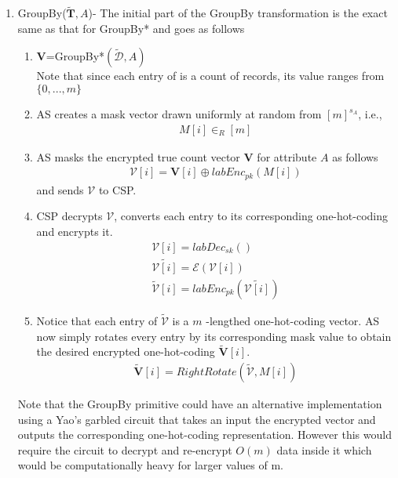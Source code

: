 \begin{enumerate}
\begin{enumerate} [label=(\alph*)]
\end{enumerate}
\item \textsf{GroupBy}($\mathbf{\tilde{T}},A$)- The initial part of the  \textsf{GroupBy} transformation is the exact same as that  for \textsf{GroupBy*} and goes as follows   \begin{enumerate}\item $\mathbf{V}$=\textsf{GroupBy*}$(\boldsymbol{\tilde{\mathcal{D}}},A)$ \\Note that since each entry of is a count of records, its value ranges from $\{0,...,m\}$\item \textsf{AS} creates a mask vector drawn uniformly at random from $[m]^{s_A}$, i.e.,  \begin{gather} M[i] \in_R [m]\end{gather} \item \textsf{AS} masks the encrypted true count vector $\mathbf{V}$ for attribute $A$ as follows \begin{gather}\boldsymbol{\mathcal{V}}[i]= \mathbf{V}[i] \oplus labEnc_{pk}(M[i])\end{gather} and sends $\boldsymbol{\mathcal{V}}$ to \textsf{CSP}.\item \textsf{CSP} decrypts $\boldsymbol{\mathcal{V}}$, converts each entry to its corresponding one-hot-coding and encrypts it. \begin{gather*}\mathcal{V}[i]=labDec_{sk}(\boldsymbol{})\\\tilde{\mathcal{V}[i]}=\mathcal{E}(\mathcal{V}[i])\\\boldsymbol{\tilde{\mathcal{V}}}[i]=labEnc_{pk}(\tilde{\mathcal{V}[i]})\end{gather*}\item Notice that each entry of $\boldsymbol{\tilde{\mathcal{V}}}$ is a $m$ -lengthed one-hot-coding vector. \textsf{AS} now simply rotates every entry by its corresponding mask value to obtain the desired  encrypted one-hot-coding $\boldsymbol{\tilde{V}}[i]$. \begin{gather}\boldsymbol{\tilde{V}}[i]=RightRotate(\boldsymbol{\tilde{\mathcal{V}}},M[i])\end{gather}  \end{enumerate} Note that the \textsf{GroupBy} primitive could have an alternative implementation using a Yao's garbled circuit that takes an input the encrypted vector and outputs the corresponding one-hot-coding representation. However this would require the circuit to decrypt and re-encrypt $O(m)$ data inside it which would be computationally heavy for larger values of m. 

\end{enumerate}
